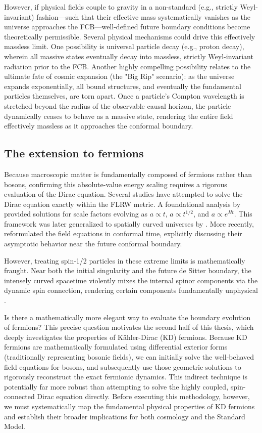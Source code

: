 However, if physical fields couple to gravity in a non-standard (e.g., strictly Weyl-invariant) fashion—such that their effective mass systematically vanishes as the universe approaches the FCB—well-defined future boundary conditions become theoretically permissible. Several physical mechanisms could drive this effectively massless limit. One possibility is universal particle decay (e.g., proton decay), wherein all massive states eventually decay into massless, strictly Weyl-invariant radiation prior to the FCB. Another highly compelling possibility relates to the ultimate fate of cosmic expansion (the "Big Rip" scenario): as the universe expands exponentially, all bound structures, and eventually the fundamental particles themselves, are torn apart. Once a particle's Compton wavelength is stretched beyond the radius of the observable causal horizon, the particle dynamically ceases to behave as a massive state, rendering the entire field effectively massless as it approaches the conformal boundary.

\subsection{The extension to fermions}

Because macroscopic matter is fundamentally composed of fermions rather than bosons, confirming this absolute-value energy scaling requires a rigorous evaluation of the Dirac equation. Several studies have attempted to solve the Dirac equation exactly within the FLRW metric. A foundational analysis by \citet{PhysRevD.36.3705} provided solutions for scale factors evolving as $a\propto t$, $a\propto t^{1/2}$, and $a\propto e^{Ht}$. This framework was later generalized to spatially curved universes by \citet{Huang:2005rn}. More recently, \citet{Ibison11} reformulated the field equations in conformal time, explicitly discussing their asymptotic behavior near the future conformal boundary.

However, treating spin-1/2 particles in these extreme limits is mathematically fraught. Near both the initial singularity and the future de Sitter boundary, the intensely curved spacetime violently mixes the internal spinor components via the dynamic spin connection, rendering certain components fundamentally unphysical \cite{Ibison11}. 

Is there a mathematically more elegant way to evaluate the boundary evolution of fermions? This precise question motivates the second half of this thesis, which deeply investigates the properties of Kähler-Dirac (KD) fermions. Because KD fermions are mathematically formulated using differential exterior forms (traditionally representing bosonic fields), we can initially solve the well-behaved field equations for bosons, and subsequently use those geometric solutions to rigorously reconstruct the exact fermionic dynamics. This indirect technique is potentially far more robust than attempting to solve the highly coupled, spin-connected Dirac equation directly. Before executing this methodology, however, we must systematically map the fundamental physical properties of KD fermions and establish their broader implications for both cosmology and the Standard Model.


\printbibliography[heading=subbibintoc, title={References for Chapter \thechapter}]
